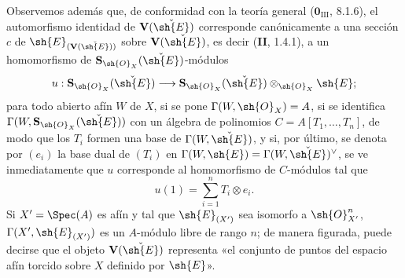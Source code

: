 
Observemos además que, de conformidad con la teoría general ($\mathbf 0_{\mathrm{III}}$, 8.1.6), el automorfismo identidad de $\mathbf V(\check{\sh{E}})$ corresponde canónicamente a una sección $c$ de $\sh{E}_{(\mathbf V(\check{\sh{E}}))}$ sobre $\mathbf V(\check{\sh{E}})$, es decir (\textbf{II}, 1.4.1), a un homomorfismo de $\mathbf S_{\sh{O}_X}(\check{\sh{E}})$-módulos
\[
  u:\mathbf S_{\sh{O}_X}(\check{\sh{E}})\longrightarrow
  \mathbf S_{\sh{O}_X}(\check{\sh{E}})\otimes_{\sh{O}_X}\sh{E};
\]
para todo abierto afín $W$ de $X$, si se pone $\Gamma(W,\sh{O}_X)=A$, si se identifica $\Gamma(W,\mathbf S_{\sh{O}_X}(\check{\sh{E}}))$ con un álgebra de polinomios $C=A[T_1,\ldots,T_n]$, de modo que los $T_i$ formen una base de $\Gamma(W,\check{\sh{E}})$, y si, por último, se denota por $(e_i)$ la base dual de $(T_i)$ en $\Gamma(W,\sh{E})=\Gamma(W,\check{\sh{E}})^\vee$, se ve inmediatamente que $u$ corresponde al homomorfismo de $C$-módulos tal que
\[
  u(1)=\sum_{i=1}^n T_i\otimes e_i.
\]
Si $X'=\Spec(A)$ es afín y tal que $\sh{E}_{(X')}$ sea isomorfo a $\sh{O}_{X'}^n$, $\Gamma(X',\sh{E}_{(X')})$ es un $A$-módulo libre de rango $n$; de manera figurada, puede decirse que el objeto $\mathbf V(\check{\sh{E}})$ representa «el conjunto de puntos del espacio afín torcido sobre $X$ definido por $\sh{E}$».


